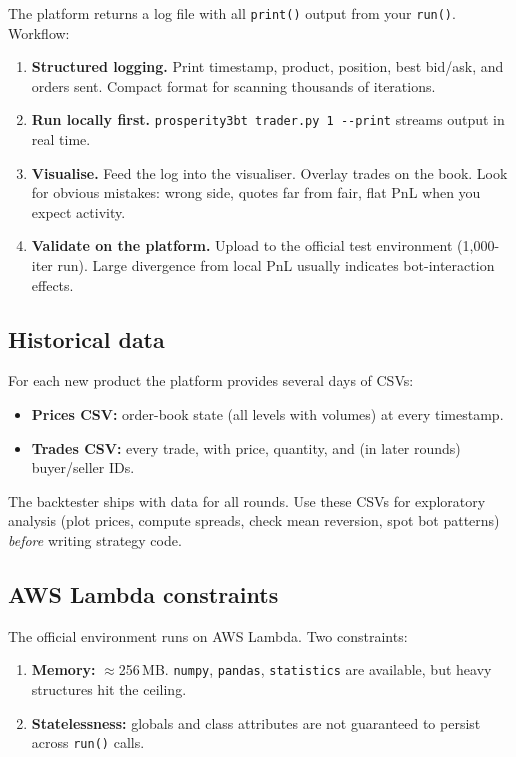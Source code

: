 The platform returns a log file with all \texttt{print()} output from
your \texttt{run()}.  Workflow:

\begin{enumerate}
  \item \textbf{Structured logging.}  Print timestamp, product,
  position, best bid/ask, and orders sent.  Compact format for scanning
  thousands of iterations.
  \item \textbf{Run locally first.}  \texttt{prosperity3bt trader.py 1
  -{}-print} streams output in real time.
  \item \textbf{Visualise.}  Feed the log into the visualiser.  Overlay
  trades on the book.  Look for obvious mistakes: wrong side, quotes far
  from fair, flat PnL when you expect activity.
  \item \textbf{Validate on the platform.}  Upload to the official test
  environment (1{,}000-iter run).  Large divergence from local PnL
  usually indicates bot-interaction effects.
\end{enumerate}

\subsection{Historical data}

For each new product the platform provides several days of CSVs:
\begin{itemize}
  \item \textbf{Prices CSV:} order-book state (all levels with volumes)
  at every timestamp.
  \item \textbf{Trades CSV:} every trade, with price, quantity, and (in
  later rounds) buyer/seller IDs.
\end{itemize}

The backtester ships with data for all rounds.  Use these CSVs for
exploratory analysis (plot prices, compute spreads, check mean
reversion, spot bot patterns) \emph{before} writing strategy code.

\subsection{AWS Lambda constraints}

The official environment runs on AWS Lambda.  Two constraints:

\begin{enumerate}
  \item \textbf{Memory:} $\approx$256\,MB.  \texttt{numpy}, \texttt{pandas},
  \texttt{statistics} are available, but heavy structures hit the ceiling.
  \item \textbf{Statelessness:} globals and class attributes are not
  guaranteed to persist across \texttt{run()} calls.
\end{enumerate}

